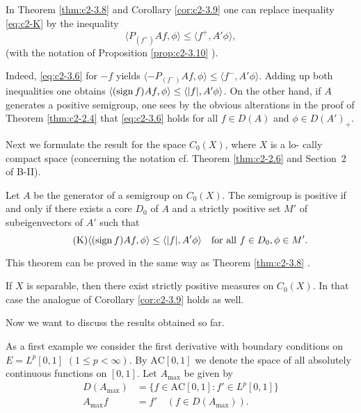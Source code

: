 \begin{remark}\label{rem:c2-3.12}
In Theorem \ref{thm:c2-3.8} and Corollary \ref{cor:c2-3.9}  one can replace inequality \eqref{eq:c2-K}   by the inequality
\begin{equation}\label{eq:c2-3.6}
\langle P_{(f^{+})}Af,\phi \rangle \leq \langle f^{+},A'\phi \rangle,
\end{equation}
(with the notation of Proposition \ref{prop:c2-3.10}   ).

Indeed, \eqref{eq:c2-3.6} for $-f$ yields $\langle -P_{(f^{-})}Af,\phi \rangle \leq \langle f^{-},A'\phi \rangle$. 
Adding up both inequalities one obtains $\langle(\operatorname{sign} f)Af,\phi \rangle \leq \langle |f|,A'\phi \rangle$.
On the other hand, if $A$ generates a positive semigroup, one sees by
the obvious alterations in the proof of Theorem \ref{thm:c2-2.4}   that \eqref{eq:c2-3.6} holds for all $f \in D(A)$ and $\phi \in D(A')_{+}$. 

Next we formulate the result for the space $C_{0}(X)$, where $X$ is a lo-
cally compact space (concerning the notation cf. Theorem \ref{thm:c2-2.6} and Section~2 of B-II).
\end{remark}

\begin{theorem}\label{thm:c2-3.13}
Let $A$ be the generator of a semigroup on $C_{0}(X)$.
The semigroup is positive if and only if there exists a core $D_{0}$ of
$A$ and a strictly positive set $M'$ of subeigenvectors of $A'$ such
that
\begin{equation}\label{eq:c2-K7} \tag{K}
\langle(\operatorname{sign} f)Af,\phi \rangle \leq \langle |f|,A'\phi \rangle \quad \text{for all } f \in D_{0}, \phi \in M'.
\end{equation}
\end{theorem}
This theorem can be proved in the same way as Theorem \ref{thm:c2-3.8}  .

\begin{remark*}
If $X$ is separable, then there exist strictly positive
measures on $C_{0}(X)$. 
In that case the analogue of Corollary \ref{cor:c2-3.9}   holds
as well.
\end{remark*}

Now we want to discuss the results obtained so far.

As a first example we consider the first derivative with boundary
conditions on $E = L^{p}[0,1]$ $(1 \leq p < \infty)$. By $\text{AC}[0,1]$ we denote the space of all absolutely continuous functions on $[0,1]$. 
Let $A_{\max}$ be given by
\begin{align*}
D(A_{\max}) &= \{f \in \text{AC}[0,1] : f' \in L^{p}[0,1]\}\\
A_{\max}f &= f' \quad (f \in D(A_{\max})).
\end{align*}

